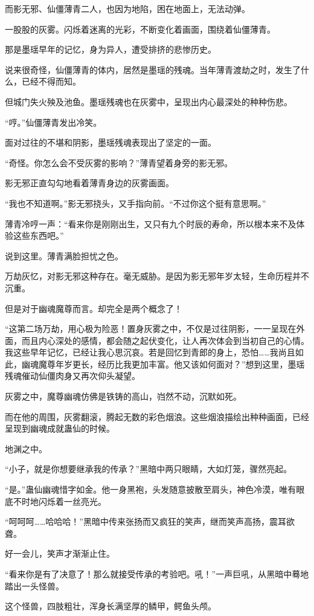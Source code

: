 \begin{this_body}
而影无邪、仙僵薄青二人，也因为地陷，困在地面上，无法动弹。

一股股的灰雾。闪烁着迷离的光彩，不断变化着画面，围绕着仙僵薄青。

那是墨瑶早年的记忆，身为异人，遭受排挤的悲惨历史。

说来很奇怪，仙僵薄青的体内，居然是墨瑶的残魂。当年薄青渡劫之时，发生了什么，已经不得而知。

但城门失火殃及池鱼。墨瑶残魂也在灰雾中，呈现出内心最深处的种种伤悲。

“哼。”仙僵薄青发出冷笑。

面对过往的不堪和阴影，墨瑶残魂表现出了坚定的一面。

“奇怪。你怎么会不受灰雾的影响？”薄青望着身旁的影无邪。

影无邪正直勾勾地看着薄青身边的灰雾画面。

“我也不知道啊。”影无邪挠头，又手指向前。“不过你这个挺有意思啊。”

薄青冷哼一声：“看来你是刚刚出生，又只有九个时辰的寿命，所以根本来不及体验这些东西吧。”

说到这里。薄青满脸担忧之色。

万劫灰忆，对影无邪这种存在。毫无威胁。是因为影无邪年岁太轻，生命历程并不沉重。

但是对于幽魂魔尊而言。却完全是两个概念了！

“这第二场万劫，用心极为险恶！置身灰雾之中，不仅是过往阴影，一一呈现在外面，而且内心深处的感情，都会随之起伏变化，让人再次体会到当初自己的心情。我这些早年记忆，已经让我心思沉哀。若是回忆到青郎的身上，恐怕……我尚且如此，幽魂魔尊年岁更长，经历比我更加丰富。他又该如何面对？”想到这里，墨瑶残魂催动仙僵肉身又再次仰头凝望。

灰雾之中，魔尊幽魂仿佛是铁铸的高山，岿然不动，沉默如死。

而在他的周围，灰雾翻滚，腾起无数的彩色烟浪。这些烟浪描绘出种种画面，已经呈现到幽魂成就蛊仙的时候。

地渊之中。

“小子，就是你想要继承我的传承？”黑暗中两只眼睛，大如灯笼，骤然亮起。

“是。”蛊仙幽魂惜字如金。他一身黑袍，头发随意披散至肩头，神色冷漠，唯有眼底不时地闪烁着一丝亮光。

“呵呵呵……哈哈哈！”黑暗中传来张扬而又疯狂的笑声，继而笑声高扬，震耳欲聋。

好一会儿，笑声才渐渐止住。

“看来你是有了决意了！那么就接受传承的考验吧。吼！”一声巨吼，从黑暗中蓦地踏出一头怪兽。

这个怪兽，四肢粗壮，浑身长满坚厚的鳞甲，鳄鱼头颅。


\end{this_body}
